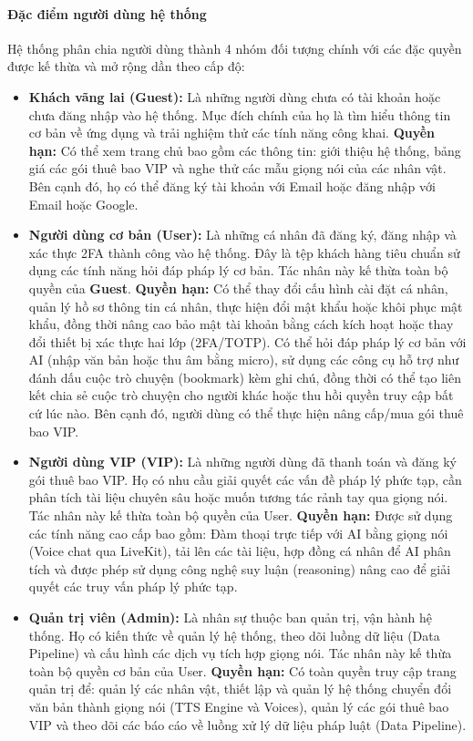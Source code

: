 \paragraph{Đặc điểm người dùng hệ thống}

Hệ thống phân chia người dùng
thành 4 nhóm đối tượng chính
với các đặc quyền được kế thừa
và mở rộng dần theo cấp độ:

\begin{itemize}

\item \textbf{Khách vãng lai (Guest):}
Là những người dùng chưa có tài khoản
hoặc chưa đăng nhập vào hệ thống.
Mục đích chính của họ
là tìm hiểu thông tin cơ bản về ứng dụng
và trải nghiệm thử các tính năng công khai.
\textbf{Quyền hạn:}
Có thể xem trang chủ bao gồm các thông tin:
giới thiệu hệ thống, bảng giá các gói thuê bao VIP
và nghe thử các mẫu giọng nói của các nhân vật.
Bên cạnh đó, họ có thể đăng ký tài khoản với Email
hoặc đăng nhập với Email hoặc Google.

\item \textbf{Người dùng cơ bản (User):}
Là những cá nhân đã đăng ký, đăng nhập
và xác thực 2FA
thành công vào hệ thống.
Đây là tệp khách hàng tiêu chuẩn
sử dụng các tính năng
hỏi đáp pháp lý cơ bản.
Tác nhân này kế thừa toàn bộ quyền của \textbf{Guest}.
\textbf{Quyền hạn:}
Có thể
thay đổi cấu hình cài đặt cá nhân,
quản lý hồ sơ thông tin cá nhân,
thực hiện đổi mật khẩu hoặc khôi phục mật khẩu,
đồng thời nâng cao bảo mật tài khoản bằng cách kích hoạt hoặc thay đổi thiết bị xác thực hai lớp (2FA/TOTP).
Có thể hỏi đáp pháp lý cơ bản với AI (nhập văn bản hoặc thu âm bằng micro),
sử dụng các công cụ hỗ trợ như đánh dấu cuộc trò chuyện (bookmark) kèm ghi chú, đồng thời có thể tạo liên kết chia sẻ cuộc trò chuyện cho người khác hoặc thu hồi quyền truy cập bất cứ lúc nào.
Bên cạnh đó, người dùng có thể thực hiện nâng cấp/mua gói thuê bao VIP.

\item \textbf{Người dùng VIP (VIP):}
Là những người dùng đã thanh toán
và đăng ký gói thuê bao VIP.
Họ có nhu cầu giải quyết
các vấn đề pháp lý phức tạp,
cần phân tích tài liệu chuyên sâu
hoặc muốn tương tác rảnh tay qua giọng nói.
Tác nhân này kế thừa toàn bộ quyền của User.
\textbf{Quyền hạn:}
Được sử dụng các tính năng cao cấp bao gồm:
Đàm thoại trực tiếp với AI bằng giọng nói
(Voice chat qua LiveKit),
tải lên các tài liệu, hợp đồng cá nhân để AI phân tích
và được phép sử dụng công nghệ suy luận (reasoning) nâng cao
để giải quyết các truy vấn pháp lý phức tạp.

\item \textbf{Quản trị viên (Admin):}
Là nhân sự thuộc ban quản trị, vận hành hệ thống.
Họ có kiến thức
về quản lý hệ thống,
theo dõi luồng dữ liệu (Data Pipeline)
và cấu hình các dịch vụ tích hợp giọng nói.
Tác nhân này kế thừa toàn bộ quyền cơ bản của User.
\textbf{Quyền hạn:}
Có toàn quyền truy cập trang quản trị để:
quản lý các nhân vật,
thiết lập và quản lý hệ thống chuyển đổi văn bản thành giọng nói
(TTS Engine và Voices),
quản lý các gói thuê bao VIP
và theo dõi các báo cáo về luồng xử lý dữ liệu pháp luật (Data Pipeline).
\end{itemize}
